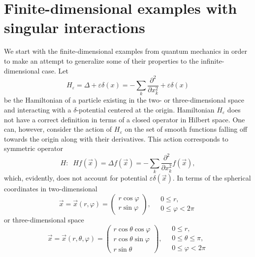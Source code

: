 \documentclass[12pt]{article}
\newcommand{\ve}{\varepsilon}
\begin{document}
\section{Finite-dimensional examples with
         singular interactions}
    We start with the finite-dimensional examples
    from quantum mechanics
	in order to make an attempt to generalize some of their properties
	to the infinite-dimensional case.
	Let
\begin{equation*}
    H_{\ve} = \Delta + \ve \delta(x)
	= -\sum_{k} \frac{\partial^{2}}{\partial x_{k}^{2}}
	    + \ve \delta(x)
\end{equation*}
	be the Hamiltonian of a particle existing in the two- or three-dimensional space
	and interacting with a
$ \delta $-potential centered at the origin.
	Hamiltonian
$ H_{\ve} $
	does not have a correct definition in terms of a closed operator
	in Hilbert space.
	One can, however, consider the action of
$ H_{\ve} $
	on the set of smooth functions falling off towards the origin along with their derivatives.
	This action corresponds to symmetric operator
\begin{equation*}
    H: \;\; H f(\vec{x}) = \Delta f(\vec{x}) =
	-\sum_{k} \frac{\partial^{2}}{\partial x_{k}^{2}} f(\vec{x}) ,
\end{equation*}
	which, evidently, does not account for potential
$ \ve \delta(\vec{x}) $.
	In terms of the spherical coordinates in two-dimensional
\begin{equation*}
    \vec{x} = \vec{x}(r,\varphi)
    = \begin{pmatrix} r\cos\varphi\\
        r\sin\varphi
        \end{pmatrix}, \quad
    \begin{array}{l}
	0 \leq r,\\ 0 \leq\varphi < 2\pi
    \end{array}
\end{equation*}
	or three-dimensional space
\begin{equation}
\label{sphchange}
    \vec{x} = \vec{x}(r,\theta,\varphi)
    = \begin{pmatrix} r\cos\theta \cos\varphi\\
        r\cos\theta \sin\varphi\\
        r\sin\theta
        \end{pmatrix}, \quad
    \begin{array}{l}
	0 \leq r, \\
	0 \leq\theta\leq\pi,\\
	0 \leq\varphi < 2\pi
    \end{array}
\end{equation}
\end{document}

